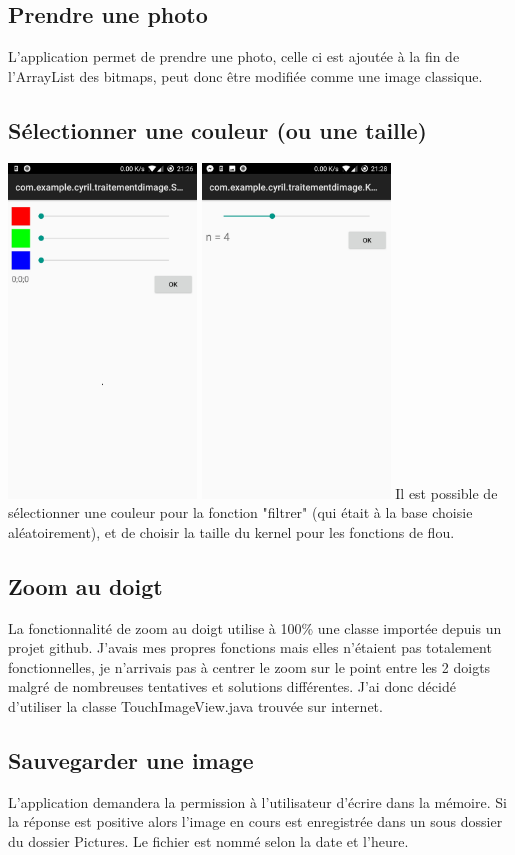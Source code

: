 \documentclass[a4paper, 12pt]{report}
\begin{document}
\subsection{Prendre une photo}
L'application permet de prendre une photo, celle ci est ajoutée à la fin de l'ArrayList des bitmaps, peut donc être modifiée comme une image classique.
\subsection{Sélectionner une couleur (ou une taille)}
\includegraphics[width=5cm,scale=1]{ressources/select1.jpg}
\includegraphics[width=5cm,scale=1]{ressources/select2.jpg}
\newline Il est possible de sélectionner une couleur pour la fonction "filtrer" (qui était à la base choisie aléatoirement), et de choisir la taille du kernel pour les fonctions de flou.
\subsection{Zoom au doigt}
La fonctionnalité de zoom au doigt utilise à 100\% une classe importée depuis un projet github. J'avais mes propres fonctions mais elles n'étaient pas totalement fonctionnelles, je n'arrivais pas à centrer le zoom sur le point entre les 2 doigts malgré de nombreuses tentatives et solutions différentes. J'ai donc décidé d'utiliser la classe TouchImageView.java trouvée sur internet.
\subsection{Sauvegarder une image}
L'application demandera la permission à l'utilisateur d'écrire dans la mémoire. Si la réponse est positive alors l'image en cours est enregistrée dans un sous dossier du dossier Pictures. Le fichier est nommé selon la date et l'heure.
\end{document}
